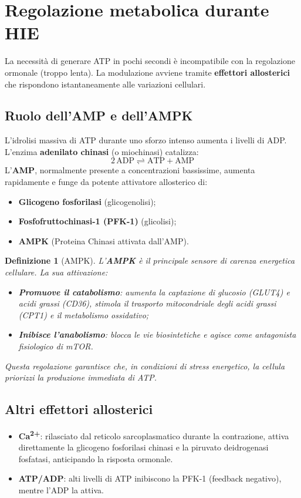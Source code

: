 \documentclass[12pt,a4paper]{report}
\newtheorem{definizione}{Definizione}[section]
\begin{document}
\section{Regolazione metabolica durante HIE}
La necessità di generare ATP in pochi secondi è incompatibile con la regolazione ormonale (troppo lenta). La modulazione avviene tramite \textbf{effettori allosterici} che rispondono istantaneamente alle variazioni cellulari.
\subsection{Ruolo dell'AMP e dell'AMPK}
L'idrolisi massiva di ATP durante uno sforzo intenso aumenta i livelli di ADP. L'enzima \textbf{adenilato chinasi} (o miochinasi) catalizza:
\[
\mathrm{2\,ADP \rightleftharpoons ATP + AMP}
\]
L'\textbf{AMP}, normalmente presente a concentrazioni bassissime, aumenta rapidamente e funge da potente attivatore allosterico di:
\begin{itemize}
\item \textbf{Glicogeno fosforilasi} (glicogenolisi);
\item \textbf{Fosfofruttochinasi-1 (PFK-1)} (glicolisi);
\item \textbf{AMPK} (Proteina Chinasi attivata dall'AMP).
\end{itemize}
\begin{definizione}[AMPK]
L'\textbf{AMPK} è il principale sensore di carenza energetica cellulare. La sua attivazione:
\begin{itemize}
\item \textbf{Promuove il catabolismo}: aumenta la captazione di glucosio (GLUT4) e acidi grassi (CD36), stimola il trasporto mitocondriale degli acidi grassi (CPT1) e il metabolismo ossidativo;
\item \textbf{Inibisce l'anabolismo}: blocca le vie biosintetiche e agisce come antagonista fisiologico di mTOR.
\end{itemize}
Questa regolazione garantisce che, in condizioni di stress energetico, la cellula priorizzi la produzione immediata di ATP.
\end{definizione}
\subsection{Altri effettori allosterici}
\begin{itemize}
\item \textbf{Ca\textsuperscript{2+}}: rilasciato dal reticolo sarcoplasmatico durante la contrazione, attiva direttamente la glicogeno fosforilasi chinasi e la piruvato deidrogenasi fosfatasi, anticipando la risposta ormonale.
\item \textbf{ATP/ADP}: alti livelli di ATP inibiscono la PFK-1 (feedback negativo), mentre l'ADP la attiva.
\end{itemize}
\end{document}
